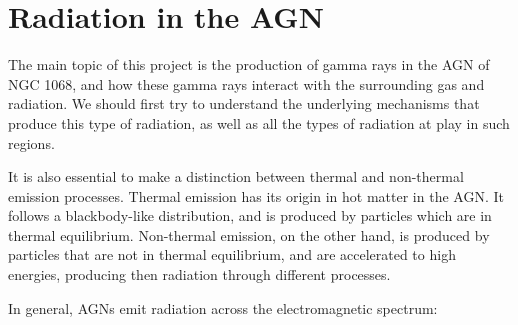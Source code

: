 \section{Radiation in the AGN}

The main topic of this project is the production of gamma rays in the AGN of NGC 1068, and how these gamma rays interact with the surrounding gas and radiation. We should first try to understand the underlying mechanisms that produce this type of radiation, as well as all the types of radiation at play in such regions.

It is also essential to make a distinction between thermal and non-thermal emission processes. Thermal emission has its origin in hot matter in the AGN. It follows a blackbody-like distribution, and is produced by particles which are in thermal equilibrium. Non-thermal emission, on the other hand, is produced by particles that are not in thermal equilibrium, and are accelerated to high energies, producing then radiation through different processes.

In general, AGNs emit radiation across the electromagnetic spectrum:

